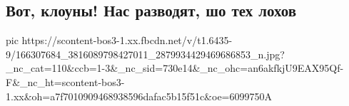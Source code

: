  
 
 
 
 
\subsection{Вот, клоуны!  Нас разводят, шо тех лохов}
\label{sec:28_03_2021.mischishin_mihail.1.lohi}

\ifcmt
  pic https://scontent-bos3-1.xx.fbcdn.net/v/t1.6435-9/166307684_3816089798427011_2879934429469686853_n.jpg?_nc_cat=110&ccb=1-3&_nc_sid=730e14&_nc_ohc=an6akfkjU9EAX95Qf-F&_nc_ht=scontent-bos3-1.xx&oh=a7f7010909468938596dafac5b15f51c&oe=6099750A
\fi

